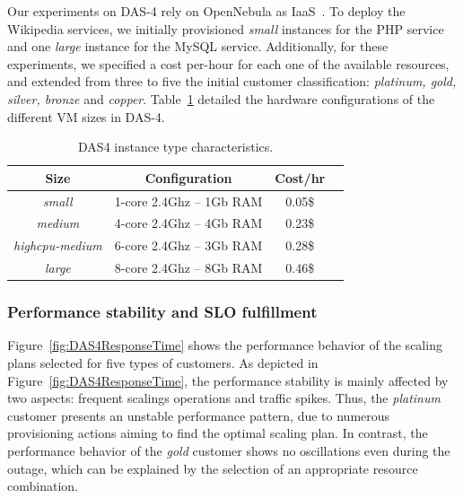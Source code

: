 Our experiments on DAS-4 rely on OpenNebula as IaaS~\cite{sotomayor_virtual_2009}. To deploy the Wikipedia services, we initially provisioned \emph{small} instances for the PHP service and one \emph{large} instance for the MySQL service. Additionally, for these experiments, we specified a cost per-hour for each one of the available resources, and extended from three to five the initial customer classification: \emph{platinum, gold, silver, bronze} and \emph{copper}. Table~\ref{DAS4instances} detailed the hardware configurations of the different VM sizes in DAS-4.


\begin{table}\label{DAS4instances}
  {\scriptsize 
\begin{center}
    \begin{tabular}{  | c | c | c | c | }
    \hline
       \textbf{Size}  & \textbf{Configuration} & \textbf{Cost/hr} \\ \hline
   \textit{small}   & 1-core 2.4Ghz -- 1Gb RAM&  0.05\$ \\ \hline
   \textit{medium}   & 4-core 2.4Ghz  -- 4Gb RAM&  0.23\$ \\ \hline
\textit{highcpu-medium} & 6-core 2.4Ghz -- 3Gb RAM& 0.28\$   \\ \hline
\textit{large} & 8-core 2.4Ghz  -- 8Gb RAM& 0.46\$   \\ \hline

 \end{tabular}
\end{center}
\vspace{-5mm}
\caption{DAS4 instance type characteristics.}
\label{DAS4instances}
}
\end{table}

\subsubsection{Performance stability and SLO fulfillment}

Figure~\ref{fig:DAS4ResponseTime} shows the performance behavior of the scaling plans selected for five types of customers. As depicted in Figure~\ref{fig:DAS4ResponseTime}, the performance stability is mainly affected by two aspects: frequent scalings operations and traffic spikes. Thus, the \emph{platinum} customer presents an unstable performance pattern, due to numerous provisioning actions aiming to find the optimal scaling plan. In contrast, the performance behavior of the \emph{gold} customer shows no oscillations even during the outage, which can be explained by the selection of an appropriate resource combination.

